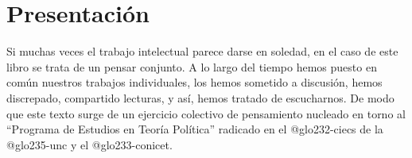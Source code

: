 



\ifPDF

\usepackage[hyphenation,homeoarchy,homeoarchywordcolor=orange, homeoarchycharcolor=orange,draft]{impnattypo}
\usepackage[allcolors=magenta, colorlinks, unicode]{hyperref}
\usepackage{easyReview}
\usepackage{hyperxmp}

	\else
	\ifBNPDF
	\usepackage[width=18truecm,height=25.5truecm,cam,center]{crop}
	\newcommand*\infofont[1]{\sf{\footnotesize #1 (ja.vill4lba@gmail.com)}}
	\crop[font=infofont]
	\usepackage[hidelinks, unicode]{hyperref}
	\usepackage{hyperxmp}
	
		\else
		\ifPNGEPUB
		\usepackage[hidelinks, unicode]{hyperref}
			\else
			\ifHTMLEPUB
			\usepackage[allcolors=blue,colorlinks,hyperindex=true,unicode]{hyperref}
			\fi
		\fi
	\fi
\fi


\frontmatter

\ifHTMLEPUB
	\ifdefined\HCode
	\newpage
	\fi
\fi

\ifPDF

\tableofcontents
	\else
	\ifBNPDF
	
	\tableofcontents
		\else
		\ifPNGEPUB
		
		\tableofcontents
		\fi
	\fi
\fi

\ifHTMLEPUB
\tableofcontents
\fi

\chapter[\hspace{0pc}Presentación]{Presentación} %


Si muchas veces el trabajo intelectual parece darse en soledad, en el caso de este libro se trata de un pensar conjunto. A lo largo del tiempo hemos puesto en común nuestros trabajos individuales, los hemos sometido a discusión, hemos discrepado, compartido lecturas, y así, hemos tratado de escucharnos. De modo que este texto surge de un ejercicio colectivo de pensamiento nucleado en torno al \enquote{Programa de Estudios en Teoría Política} radicado en el \gls{@glo232-ciecs} de la \gls{@glo235-unc} y el \gls{@glo233-conicet}.

